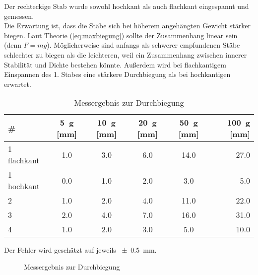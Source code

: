 Der rechteckige Stab wurde sowohl hochkant als auch flachkant eingespannt und gemessen. \\

Die Erwartung ist, dass die Stäbe sich bei höherem angehängten Gewicht stärker biegen. Laut Theorie (\cref{eq:maxbiegung}) sollte der Zusammenhang linear sein (denn $F=mg$). Möglicherweise sind anfangs als schwerer empfundenen Stäbe schlechter zu biegen als die leichteren, weil ein Zusammenhang zwischen innerer Stabilität und Dichte bestehen könnte. Außerdem wird bei flachkantigem Einspannen des 1. Stabes eine stärkere Durchbiegung als bei hochkantigen erwartet.

\begin{table}[H]
  \centering
  \begin{tabular}{l | c | c | c | c | r}
    \# & \SI{5}{g} [mm] & \SI{10}{g} [mm] & \SI{20}{g} [mm] & \SI{50}{g} [mm] & \SI{100}{g} [mm] \\ \hline
    1 flachkant & \num{1.0} & \num{3.0} & \num{6.0} & \num{14.0} & \num{27.0} \\
    1 hochkant & \num{0.0} & \num{1.0} & \num{2.0} & \num{3.0} & \num{5.0} \\
    2 & \num{1.0} & \num{2.0} & \num{4.0} & \num{11.0} & \num{22.0} \\
    3 & \num{2.0} & \num{4.0} & \num{7.0} & \num{16.0} & \num{31.0} \\
    4 & \num{1.0} & \num{2.0} & \num{3.0} & \num{5.0} & \num{10.0}
  \end{tabular}
  \caption{Messergebnis zur Durchbiegung}
  \label{tab:durchbiegung}
\end{table}
Der Fehler wird geschätzt auf jeweils \SI{\pm .5}{mm}.
\begin{figure}[H]
  \centering
  \caption{Messergebnis zur Durchbiegung}
  \label{fig:durchbiegung}
\end{figure}

